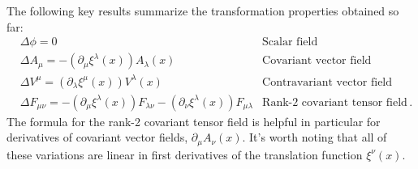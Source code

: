 \documentclass[prd,preprint,
  showpacs,showkeys,lengthcheck,
  nofootinbib,tightenlines,onecolumn,notitlepage,
  preprintnumbers,superscriptaddress]{revtex4-1}
\newcommand{\dx}{\ensuremath{\xi}}
\begin{document}
The following key results summarize the transformation properties
obtained so far:
\begin{subequations}
  \label{eqn:variations}
  \begin{align}
    &
    \Delta \phi
    =
    0
    &
    \text{Scalar field}
    \phantom{\,.}
    \\
    &
    \Delta A_\mu
    =
    - (\partial_\mu \dx^\lambda(x))
    A_\lambda(x)
    &
    \text{Covariant vector field}
    \phantom{\,.}
    \\
    &
    \Delta V^\mu
    =
    (\partial_\lambda \dx^\mu(x))
    V^\lambda(x)
    &
    \text{Contravariant vector field}
    \phantom{\,.}
    \\
    &
    \Delta F_{\mu\nu}
    =
    -
    (\partial_\mu \dx^\lambda(x)) F_{\lambda\nu}
    -
    (\partial_\nu \dx^\lambda(x)) F_{\mu\lambda}
    &
    \text{Rank-2 covariant tensor field}
    \,.
  \end{align}
\end{subequations}
The formula for the rank-2 covariant tensor field is helpful in particular
for derivatives of covariant vector fields, $\partial_\mu A_\nu(x)$.
It's worth noting that all of these variations are linear in first derivatives
of the translation function $\dx^\nu(x)$.
\end{document}
